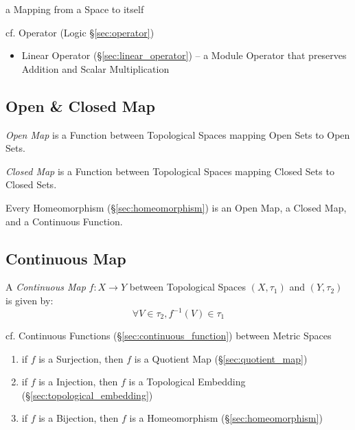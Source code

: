 a Mapping from a Space to itself

cf. Operator (Logic \S\ref{sec:operator})

\begin{itemize}
  \item Linear Operator (\S\ref{sec:linear_operator}) -- a Module Operator that
    preserves Addition and Scalar Multiplication
\end{itemize}



\subsection{Open \& Closed Map}\label{sec:open_closed_map}

\emph{Open Map} is a Function between Topological Spaces mapping Open
Sets to Open Sets.

\emph{Closed Map} is a Function between Topological Spaces mapping Closed
Sets to Closed Sets.

Every Homeomorphism (\S\ref{sec:homeomorphism}) is an Open Map, a
Closed Map, and a Continuous Function.



\subsection{Continuous Map}\label{sec:continuous_map}

A \emph{Continuous Map} $f : X \rightarrow Y$ between Topological Spaces
$(X,\tau_1)$ and $(Y,\tau_2)$ is given by:
\[
  \forall V \in \tau_2, f^{-1}(V) \in \tau_1
\]

\fist cf. Continuous Functions (\S\ref{sec:continuous_function}) between Metric
Spaces

\begin{enumerate}
  \item if $f$ is a Surjection, then $f$ is a Quotient Map
    (\S\ref{sec:quotient_map})
  \item if $f$ is a Injection, then $f$ is a Topological Embedding
    (\S\ref{sec:topological_embedding})
  \item if $f$ is a Bijection, then $f$ is a Homeomorphism
    (\S\ref{sec:homeomorphism})
\end{enumerate}

